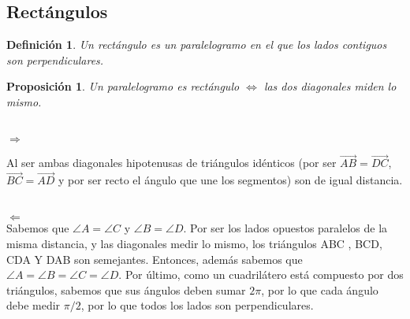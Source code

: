 \documentclass[11pt, a4paper]{article}
\makeatletter
\newif\IfInSansMode
\let\oldsf\sffamily
\renewcommand*{\sffamily}{\oldsf\mathversion{sans}\InSansModetrue}
\let\oldnorm\normalfont
\renewcommand*{\normalfont}{\oldnorm\InSansModefalse\mathversion{normal}}
\renewenvironment{proof}[1][\proofname] {\vspace{-15pt}\par\pushQED{\qed}\normalfont\topsep6\p@\@plus6\p@\relax\trivlist\item[\hskip\labelsep\it#1\@addpunct{.}]\ignorespaces}{\popQED\endtrivlist\@endpefalse}
\renewcommand{\vec}{\overrightarrow}
\renewenvironment{proof}[1][\proofname] {\par\pushQED{\qed}\normalfont\topsep6\p@\@plus6\p@\relax\trivlist\item[\hskip\labelsep\itshape\sffamily#1\@addpunct{.}]\ignorespaces}{\popQED\endtrivlist\@endpefalse}
\theoremstyle{theorem-style}
\newtheorem{nprop}{Proposición}[section]
\theoremstyle{definition-style}
\newtheorem{ndef}{Definición}[section]
\theoremstyle{remark-style}
\theoremstyle{example-style}
\makeatother
\begin{document}
\subsection{Rectángulos}
\begin{ndef}
  Un rectángulo es un paralelogramo en el que los lados contiguos son perpendiculares.
\end{ndef}


\begin{nprop}
  Un paralelogramo es rectángulo $\iff$ las dos diagonales miden lo mismo.
\end{nprop}
\begin{proof}\hfill \\
  $\boxed{\Rightarrow}$\hfill\\
   \begin{minipage}[c]{0.75\textwidth}
  
  Al ser ambas diagonales hipotenusas de triángulos idénticos (por ser $\vec{AB}=\vec{DC}$, $\vec{BC}=\vec{AD}$ y por ser recto el ángulo que une los segmentos) son de igual distancia.\hfill

  \end{minipage}\hfill
  \begin{minipage}[]{0.2\textwidth}
  

  
 
  \end{minipage}\\
  $\boxed{\Leftarrow}$ \\
  Sabemos que $\angle A = \angle C $ y $\angle B = \angle D$.
  Por ser los lados opuestos paralelos de la misma distancia, y las diagonales medir lo mismo, los triángulos ABC , BCD, CDA Y DAB son semejantes. Entonces, además sabemos que  $\angle A = \angle
 B = \angle C  = \angle D$. Por último, como un cuadrilátero está compuesto por dos triángulos, sabemos que sus ángulos deben sumar $2\pi$, por lo que cada ángulo debe
  medir $\pi/2$, por lo que todos los lados son perpendiculares.
  
\end{proof}
\end{document}
